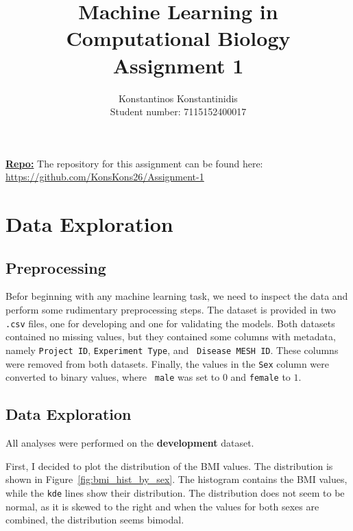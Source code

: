 \documentclass[12pt]{article}
\title{%
    Machine Learning in Computational Biology \\
    \Large Assignment 1 
    }
\author{%
    Konstantinos Konstantinidis \\
    Student number: 7115152400017
    }
\begin{document}
\maketitle

\vspace{0.5in}

\textbf{\underline{Repo:}} The repository for this assignment can be found here: \\
\url{https://github.com/KonsKons26/Assignment-1}

\vspace{0.5in}

\tableofcontents
\clearpage

\section{Data Exploration}

\subsection{Preprocessing}
Befor beginning with any machine learning task, we need to inspect the data and
perform some rudimentary preprocessing steps. The dataset is provided in two
\texttt{.csv} files, one for developing and one for validating the models. Both
datasets contained no missing values, but they contained some columns with
metadata, namely \texttt{Project ID}, \texttt{Experiment Type}, and \texttt{%
Disease MESH ID}. These columns were removed from both datasets. Finally, the
values in the \texttt{Sex} column were converted to binary values, where \texttt{%
male} was set to $0$ and \texttt{female} to $1$.


\subsection{Data Exploration}
All analyses were performed on the \textbf{development} dataset.

First, I decided to plot the distribution of the BMI values. The distribution is
shown in Figure~\ref{fig:bmi_hist_by_sex}. The histogram contains the BMI values,
while the \texttt{kde} lines show their distribution. The distribution does not seem
to be normal, as it is skewed to the right and when the values for both sexes are
combined, the distribution seems bimodal.
\end{document}
